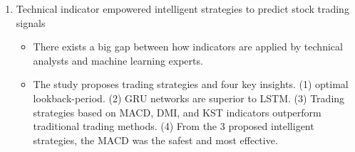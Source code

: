 \begin{enumerate}
    \item Technical indicator empowered intelligent strategies to predict stock trading signals
    \cite{saud2024technical}
    \begin{itemize}
        \item There exists a big gap between how indicators are applied by technical analysts and machine learning experts.
        \item The study proposes trading strategies and four key insights. (1) optimal lookback-period. (2) GRU networks are superior to LSTM. (3) Trading strategies based on MACD, DMI, and KST indicators outperform traditional trading methods. (4) From the 3 proposed intelligent strategies, the MACD was the safest and most effective. 
    \end{itemize}
    
\end{enumerate}

